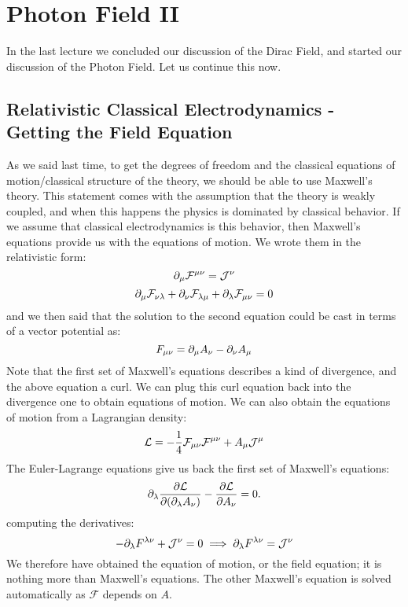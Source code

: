 \section{Photon Field II}
In the last lecture we concluded our discussion of the Dirac Field, and started our discussion of the Photon Field. Let us continue this now.

\subsection{Relativistic Classical Electrodynamics - Getting the Field Equation}
As we said last time, to get the degrees of freedom and the classical equations of motion/classical structure of the theory, we should be able to use Maxwell's theory. This statement comes with the assumption that the theory is weakly coupled, and when this happens the physics is dominated by classical behavior. If we assume that classical electrodynamics is this behavior, then Maxwell's equations provide us with the equations of motion. We wrote them in the relativistic form:
\begin{equation}
    \partial_\mu \mathcal{F}^{\mu\nu} = \mathcal{J}^\nu
\end{equation}
\begin{equation}
    \partial_\mu \mathcal{F}_{\nu\lambda} + \partial_\nu \mathcal{F}_{\lambda\mu} + \partial_\lambda \mathcal{F}_{\mu\nu} = 0
\end{equation}
and we then said that the solution to the second equation could be cast in terms of a vector potential as:
\begin{equation}
    F_{\mu\nu} = \partial_\mu A_\nu - \partial_\nu A_\mu
\end{equation}
Note that the first set of Maxwell's equations describes a kind of divergence, and the above equation a curl. We can plug this curl equation back into the divergence one to obtain equations of motion. We can also obtain the equations of motion from a Lagrangian density:
\begin{equation}
    \mathcal{L} = -\frac{1}{4}\mathcal{F}_{\mu\nu}\mathcal{F}^{\mu\nu} + A_\mu \mathcal{J}^{\mu}
\end{equation}
The Euler-Lagrange equations give us back the first set of Maxwell's equations:
\begin{equation}
    \partial_\lambda \frac{\partial \mathcal{L}}{\partial (\partial_\lambda A_\nu)} - \frac{\partial \mathcal{L}}{\partial A_\nu} = 0.
\end{equation}
computing the derivatives:
\begin{equation}
    -\partial_\lambda F^{\lambda \nu} + \mathcal{J}^\nu = 0 \implies \partial_\lambda F^{\lambda \nu} = \mathcal{J}^\nu
\end{equation}
We therefore have obtained the equation of motion, or the field equation; it is nothing more than Maxwell's equations. The other Maxwell's equation is solved automatically as $\mathcal{F}$ depends on $A$. 

